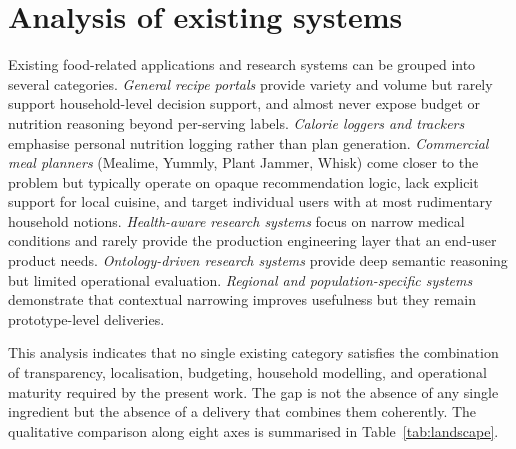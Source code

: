 \section{Analysis of existing systems}

Existing food-related applications and research systems can be grouped into several categories. \emph{General recipe portals} provide variety and volume but rarely support household-level decision support, and almost never expose budget or nutrition reasoning beyond per-serving labels. \emph{Calorie loggers and trackers} emphasise personal nutrition logging rather than plan generation. \emph{Commercial meal planners} (Mealime, Yummly, Plant Jammer, Whisk) come closer to the problem but typically operate on opaque recommendation logic, lack explicit support for local cuisine, and target individual users with at most rudimentary household notions. \emph{Health-aware research systems} \cite{jung2016,phanich2010,yera2023} focus on narrow medical conditions and rarely provide the production engineering layer that an end-user product needs. \emph{Ontology-driven research systems} \cite{al_nazer2014,bianchini2015,maneerat2013} provide deep semantic reasoning but limited operational evaluation. \emph{Regional and population-specific systems} \cite{ribeiro2018,ng2017,mao2016} demonstrate that contextual narrowing improves usefulness but they remain prototype-level deliveries.

This analysis indicates that no single existing category satisfies the combination of transparency, localisation, budgeting, household modelling, and operational maturity required by the present work. The gap is not the absence of any single ingredient but the absence of a delivery that combines them coherently. The qualitative comparison along eight axes is summarised in Table~\ref{tab:landscape}.

